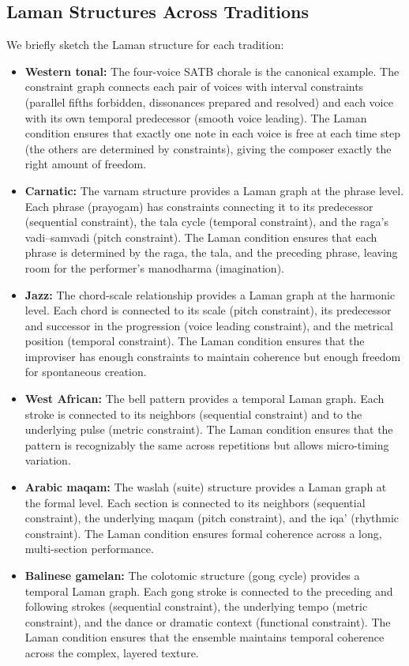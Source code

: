 \documentclass[cmj]{article}
\begin{document}
\subsection{Laman Structures Across Traditions}

We briefly sketch the Laman structure for each tradition:

\begin{itemize}[nosep]
  \item \textbf{Western tonal:} The four-voice SATB chorale is the canonical
    example. The constraint graph connects each pair of voices with interval
    constraints (parallel fifths forbidden, dissonances prepared and resolved)
    and each voice with its own temporal predecessor (smooth voice leading).
    The Laman condition ensures that exactly one note in each voice is free
    at each time step (the others are determined by constraints), giving the
    composer exactly the right amount of freedom.
  \item \textbf{Carnatic:} The varnam structure provides a Laman graph at
    the phrase level. Each phrase (prayogam) has constraints connecting it to
    its predecessor (sequential constraint), the tala cycle (temporal
    constraint), and the raga's vadi--samvadi (pitch constraint). The Laman
    condition ensures that each phrase is determined by the raga, the tala,
    and the preceding phrase, leaving room for the performer's
    manodharma (imagination).
  \item \textbf{Jazz:} The chord-scale relationship provides a Laman graph
    at the harmonic level. Each chord is connected to its scale (pitch
    constraint), its predecessor and successor in the progression (voice
    leading constraint), and the metrical position (temporal constraint).
    The Laman condition ensures that the improviser has enough constraints to
    maintain coherence but enough freedom for spontaneous creation.
  \item \textbf{West African:} The bell pattern provides a temporal Laman
    graph. Each stroke is connected to its neighbors (sequential constraint)
    and to the underlying pulse (metric constraint). The Laman condition
    ensures that the pattern is recognizably the same across repetitions
    but allows micro-timing variation.
  \item \textbf{Arabic maqam:} The waslah (suite) structure provides a
    Laman graph at the formal level. Each section is connected to its
    neighbors (sequential constraint), the underlying maqam (pitch constraint),
    and the iqa' (rhythmic constraint). The Laman condition ensures formal
    coherence across a long, multi-section performance.
  \item \textbf{Balinese gamelan:} The colotomic structure (gong cycle)
    provides a temporal Laman graph. Each gong stroke is connected to the
    preceding and following strokes (sequential constraint), the underlying
    tempo (metric constraint), and the dance or dramatic context (functional
    constraint). The Laman condition ensures that the ensemble maintains
    temporal coherence across the complex, layered texture.
\end{itemize}
\end{document}
